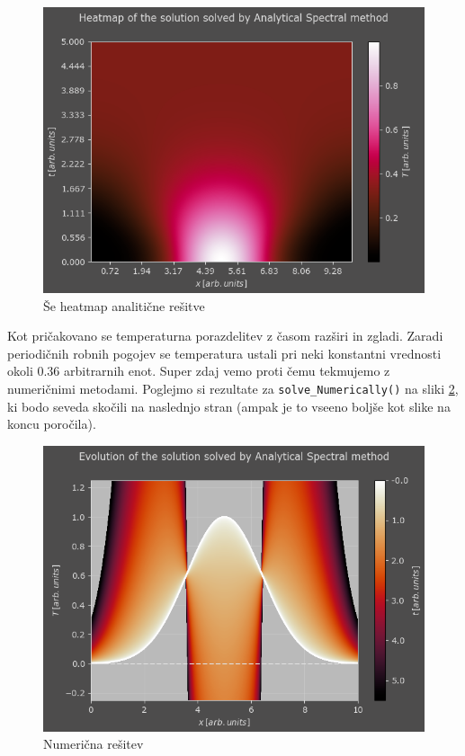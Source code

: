 \documentclass[a4paper]{article}
\begin{document}
\begin{figure}[H]
    \centering
        \includegraphics[width=\linewidth]{./images/S_Analytic_P_Heatmap.png}
        \caption{Še heatmap analitične rešitve}
    \label{fig:2}
\end{figure}

Kot pričakovano se temperaturna porazdelitev z časom razširi in zgladi. Zaradi periodičnih robnih pogojev
se temperatura ustali pri neki konstantni vrednosti okoli $0.36$ arbitrarnih enot. Super zdaj vemo proti 
čemu tekmujemo z numeričnimi metodami. Poglejmo si rezultate za \texttt{solve\_Numerically()} na sliki \ref{fig:3},
ki bodo seveda skočili na naslednjo stran (ampak je to vseeno boljše kot slike na koncu poročila).

\begin{figure}[H]
    \centering
        \includegraphics[width=\linewidth]{./images/S_Numeric_P.png}
        \caption{Numerična rešitev}
    \label{fig:3}
\end{figure}
\end{document}
